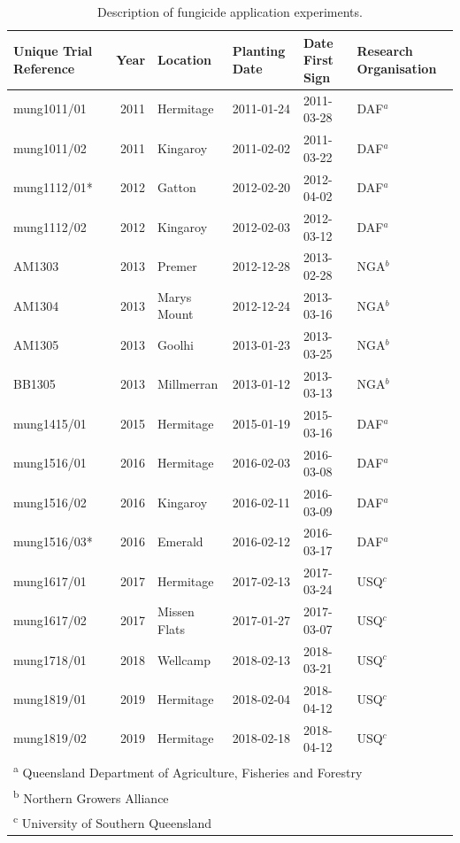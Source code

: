 \documentclass[agronomy,article,submit,moreauthors,pdftex]{mdpi}
\begin{document}
\begin{table}

\caption{\label{tab:Table1}Description of fungicide application experiments.}
\centering
\begin{tabular}[t]{lrllll}
\toprule
Unique Trial Reference & Year & Location & Planting Date & Date First Sign & Research Organisation\\
\midrule
mung1011/01 & 2011 & Hermitage & 2011-01-24 & 2011-03-28 & DAF$^{a}$\\
mung1011/02 & 2011 & Kingaroy & 2011-02-02 & 2011-03-22 & DAF$^{a}$\\
mung1112/01* & 2012 & Gatton & 2012-02-20 & 2012-04-02 & DAF$^{a}$\\
mung1112/02 & 2012 & Kingaroy & 2012-02-03 & 2012-03-12 & DAF$^{a}$\\
AM1303 & 2013 & Premer & 2012-12-28 & 2013-02-28 & NGA$^{b}$\\
\addlinespace
AM1304 & 2013 & Marys Mount & 2012-12-24 & 2013-03-16 & NGA$^{b}$\\
AM1305 & 2013 & Goolhi & 2013-01-23 & 2013-03-25 & NGA$^{b}$\\
BB1305 & 2013 & Millmerran & 2013-01-12 & 2013-03-13 & NGA$^{b}$\\
mung1415/01 & 2015 & Hermitage & 2015-01-19 & 2015-03-16 & DAF$^{a}$\\
mung1516/01 & 2016 & Hermitage & 2016-02-03 & 2016-03-08 & DAF$^{a}$\\
\addlinespace
mung1516/02 & 2016 & Kingaroy & 2016-02-11 & 2016-03-09 & DAF$^{a}$\\
mung1516/03* & 2016 & Emerald & 2016-02-12 & 2016-03-17 & DAF$^{a}$\\
mung1617/01 & 2017 & Hermitage & 2017-02-13 & 2017-03-24 & USQ$^{c}$\\
mung1617/02 & 2017 & Missen Flats & 2017-01-27 & 2017-03-07 & USQ$^{c}$\\
mung1718/01 & 2018 & Wellcamp & 2018-02-13 & 2018-03-21 & USQ$^{c}$\\
\addlinespace
mung1819/01 & 2019 & Hermitage & 2018-02-04 & 2018-04-12 & USQ$^{c}$\\
mung1819/02 & 2019 & Hermitage & 2018-02-18 & 2018-04-12 & USQ$^{c}$\\
\bottomrule
\multicolumn{6}{l}{\textsuperscript{a} Queensland Department of Agriculture, Fisheries and Forestry}\\
\multicolumn{6}{l}{\textsuperscript{b} Northern Growers Alliance}\\
\multicolumn{6}{l}{\textsuperscript{c} University of Southern Queensland}\\
\end{tabular}
\end{table}
\end{document}
